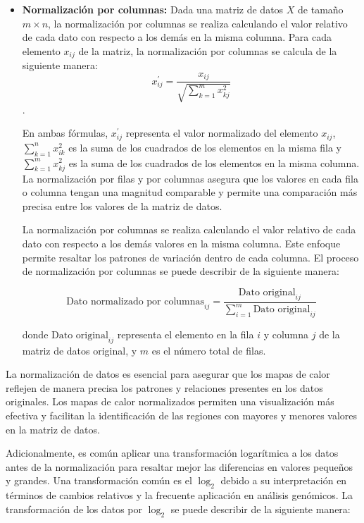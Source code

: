 \documentclass{article}
\begin{document}
\begin{itemize}
\begin{itemize}
\item \textbf{Normalización por columnas:}
Dada una matriz de datos  $X$ de tamaño  $m \times n$,   la normalización por columnas se realiza calculando el valor relativo de cada dato con respecto a los demás en la misma columna. Para cada elemento  $x_{ij}$  de la matriz, la normalización por columnas se calcula de la siguiente manera:$$x_{ij}^{'} = \frac{x_{ij}}{\sqrt{\sum_{k=1}^{m} x_{kj}^2}}$$.

En ambas fórmulas, $x_{ij}^{'}$ representa el valor normalizado del elemento $x_{ij}$, $\sum_{k=1}^{n} x_{ik}^2$ es la suma de los cuadrados de los elementos en la misma fila y $\sum_{k=1}^{m} x_{kj}^2$ es la suma de los cuadrados de los elementos en la misma columna. La normalización por filas y por columnas asegura que los valores en cada fila o columna tengan una magnitud comparable y permite una comparación más precisa entre los valores de la matriz de datos.

La normalización por columnas se realiza calculando el valor relativo de cada dato con respecto a los demás valores en la misma columna. Este enfoque permite resaltar los patrones de variación dentro de cada columna. El proceso de normalización por columnas se puede describir de la siguiente manera:

\begin{equation}
\textrm{Dato normalizado por columnas}_{ij} = \frac{\textrm{Dato original}_{ij}}{\sum_{i=1}^{m} \textrm{Dato original}_{ij}}
\end{equation}

donde $\textrm{Dato original}_{ij}$ representa el elemento en la fila $i$ y columna $j$ de la matriz de datos original, y $m$ es el número total de filas.

\end{itemize}

La normalización de datos es esencial para asegurar que los mapas de calor reflejen de manera precisa los patrones y relaciones presentes en los datos originales. Los mapas de calor normalizados permiten una visualización más efectiva y facilitan la identificación de las regiones con mayores y menores valores en la matriz de datos.

Adicionalmente, es común aplicar una transformación logarítmica a los datos antes de la normalización para resaltar mejor las diferencias en valores pequeños y grandes. Una transformación común es el $\log_2$ debido a su interpretación en términos de cambios relativos y la frecuente aplicación en análisis genómicos. La transformación de los datos por $\log_2$ se puede describir de la siguiente manera:


\end{itemize}
\end{document}
